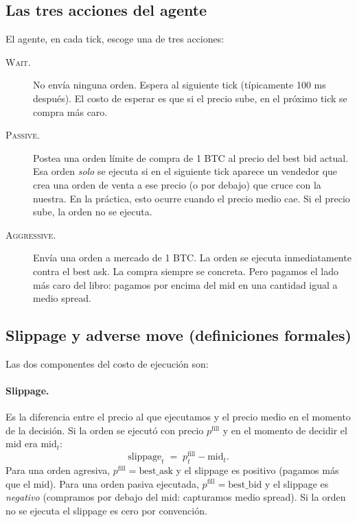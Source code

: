 \documentclass[journal,onecolumn,11pt]{IEEEtran}
\begin{document}
\subsection{Las tres acciones del agente}

El agente, en cada tick, escoge una de tres acciones:

\begin{description}
\item[\textsc{Wait}.] No envía ninguna orden. Espera al siguiente tick
      (típicamente 100 ms después). El costo de esperar es que si el
      precio sube, en el próximo tick se compra más caro.
\item[\textsc{Passive}.] Postea una orden límite de compra de 1 BTC
      al precio del best bid actual. Esa orden \emph{solo} se ejecuta
      si en el siguiente tick aparece un vendedor que crea una orden
      de venta a ese precio (o por debajo) que cruce con la nuestra.
      En la práctica, esto ocurre cuando el precio medio cae. Si el
      precio sube, la orden no se ejecuta.
\item[\textsc{Aggressive}.] Envía una orden a mercado de 1 BTC. La
      orden se ejecuta inmediatamente contra el best ask. La compra
      siempre se concreta. Pero pagamos el lado más caro del libro:
      pagamos por encima del mid en una cantidad igual a medio spread.
\end{description}

\subsection{Slippage y adverse move (definiciones formales)}

Las dos componentes del costo de ejecución son:

\paragraph{Slippage.}
Es la diferencia entre el precio al que ejecutamos y el precio medio
en el momento de la decisión. Si la orden se ejecutó con precio
$p^{\text{fill}}$ y en el momento de decidir el mid era
$\text{mid}_t$:
\begin{equation}
\text{slippage}_t \;=\; p^{\text{fill}}_t - \text{mid}_t.
\label{eq:slippage}
\end{equation}
Para una orden agresiva, $p^{\text{fill}} = \text{best\_ask}$ y el
slippage es positivo (pagamos más que el mid). Para una orden pasiva
ejecutada, $p^{\text{fill}} = \text{best\_bid}$ y el slippage es
\emph{negativo} (compramos por debajo del mid: capturamos medio
spread). Si la orden no se ejecuta el slippage es cero por convención.
\end{document}

